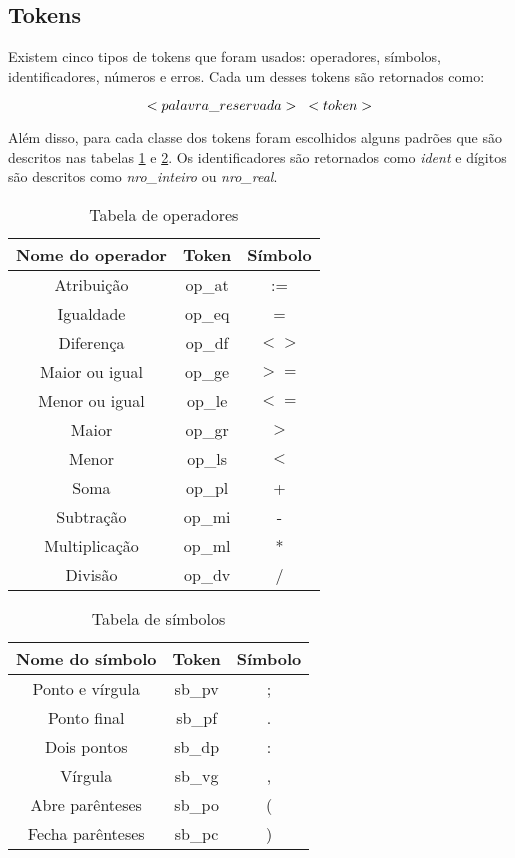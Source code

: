 \documentclass {article}
\begin{document}
	\subsection{Tokens}
		
		Existem cinco tipos de tokens que foram usados: operadores, símbolos, identificadores, números e erros. Cada um desses tokens são retornados como:
		
		\begin{equation}
			<palavra\_reservada> \hspace{3mm} <token> \nonumber
		\end{equation}
		
		Além disso, para cada classe dos tokens foram escolhidos alguns padrões que são descritos nas tabelas \ref{tb_op} e \ref{tb_sb}. Os identificadores são retornados como \emph{ident} e dígitos são descritos como \emph{nro\_inteiro} ou \emph{nro\_real}.
		
		\begin{table}[ht]
		
		\centering
		\begin{tabular}{ccc}
			\toprule
			Nome do operador & Token & Símbolo\\
			\hline
			\hline
				Atribuição & op\_at & := \\
				Igualdade & op\_eq & = \\ 
				Diferença &  op\_df & $<>$ \\ 
				Maior ou igual & op\_ge & $>=$ \\ 
				Menor ou igual & op\_le & $<=$ \\ 
				Maior & op\_gr & $>$ \\
				Menor &op\_ls & $<$ \\ 
				Soma & op\_pl & + \\ 
				Subtração & op\_mi & - \\ 
				Multiplicação & op\_ml & * \\
				Divisão & op\_dv & / \\
			\bottomrule
		\end{tabular}
		\caption{Tabela de operadores}
		\label{tb_op}
		
		\end{table}		\begin{table}[ht]
		
		\centering
		\begin{tabular}{ccc}
			\toprule
			Nome do símbolo & Token & Símbolo\\
			\hline
			\hline
				Ponto e vírgula & sb\_pv & ; \\
				Ponto final &  sb\_pf & . \\ 
				Dois pontos & sb\_dp & : \\ 
				Vírgula & sb\_vg & , \\
				Abre parênteses &sb\_po & ( \\ 
				Fecha parênteses & sb\_pc & ) \\ 
			\bottomrule
		\end{tabular}
		\caption{Tabela de símbolos}
		\label{tb_sb}
		
		\end{table}
		
\end{document}
